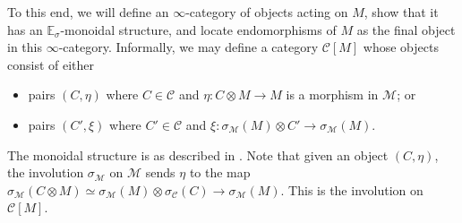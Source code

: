 \documentclass{article}
\newcommand{\EE}{\mathbb{E}}
\theoremstyle{definition}
\begin{document}
To this end, we will define an $ \infty $-category of objects acting on $ M $, show that it has an $ \EE_\sigma $-monoidal structure, and locate endomorphisms of $ M $ as the final object in this $ \infty $-category. 
Informally, we may define a category $ \mathcal{C}[M] $ whose objects consist of either
\begin{itemize}
    \item pairs $ (C, \eta) $ where $ C \in \mathcal{C} $ and $ \eta \colon C \otimes M \to M $ is a morphism in $ \mathcal{M} $; or
    \item pairs $ (C', \xi) $ where $ C'\in \mathcal{C} $ and $ \xi \colon \sigma_{\mathcal{M}}(M) \otimes C' \to \sigma_{\mathcal{M}}(M) $. 
\end{itemize} 
The monoidal structure is as described in \cite[\S4.7.1]{LurHA}. 
Note that given an object $ (C, \eta) $, the involution $ \sigma_\mathcal{M} $ on $ \mathcal{M} $ sends $ \eta $ to the map $ \sigma_{\mathcal{M}}\left(C \otimes M\right)\simeq \sigma_{\mathcal{M}}(M) \otimes \sigma_{\mathcal{C}}(C) \to \sigma_{\mathcal{M}}(M) $. 
This is the involution on $ \mathcal{C}[M] $. 
\end{document}
